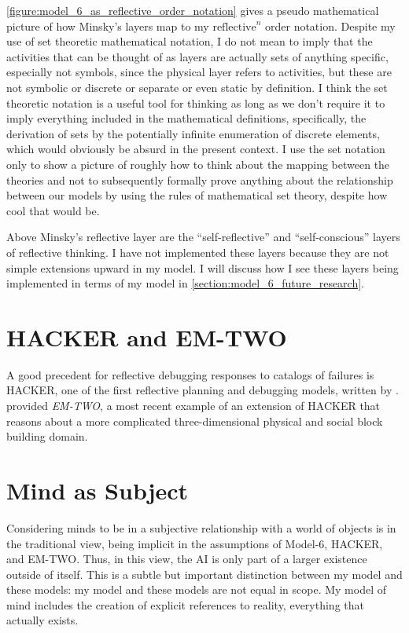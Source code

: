 \autoref{figure:model_6_as_reflective_order_notation} gives a pseudo
mathematical picture of how Minsky's layers map to my
$\text{reflective}^n$ order notation.  Despite my use of set theoretic
mathematical notation, I do not mean to imply that the activities that
can be thought of as layers are actually sets of anything specific,
especially not symbols, since the physical layer refers to activities,
but these are not symbolic or discrete or separate or even static by
definition.  I think the set theoretic notation is a useful tool for
thinking as long as we don't require it to imply everything included
in the mathematical definitions, specifically, the derivation of sets
by the potentially infinite enumeration of discrete elements, which
would obviously be absurd in the present context.  I use the set
notation only to show a picture of roughly how to think about the
mapping between the theories and not to subsequently formally prove
anything about the relationship between our models by using the rules
of mathematical set theory, despite how cool that would be.

Above Minsky's reflective layer are the ``self-reflective'' and
``self-conscious'' layers of reflective thinking.  I have not
implemented these layers because they are not simple extensions upward
in my model.  I will discuss how I see these layers being implemented
in terms of my model in \autoref{section:model_6_future_research}.

\section{HACKER and EM-TWO}

A good precedent for reflective debugging responses to catalogs of
failures is HACKER, one of the first reflective planning and debugging
models, written by \cite{sussman:1973}.  \cite{singh:2005} provided
\emph{EM-TWO}, a most recent example of an extension of HACKER that
reasons about a more complicated three-dimensional physical and social
block building domain.

\section{Mind as Subject}

Considering minds to be in a subjective relationship with a world of
objects is in the traditional view, being implicit in the assumptions
of Model-6, HACKER, and EM-TWO.  Thus, in this view, the AI is only
part of a larger existence outside of itself.  This is a subtle but
important distinction between my model and these models: my model and
these models are not equal in scope.  My model of mind includes the
creation of explicit references to reality, everything that actually
exists.

